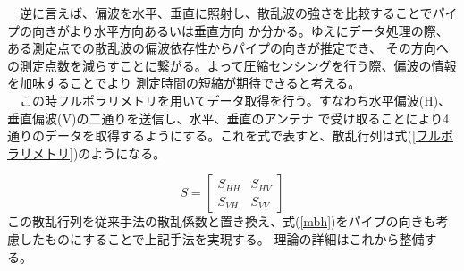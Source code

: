 \documentclass[12pt,a4paper]{jsreport}
\begin{document}
　逆に言えば、偏波を水平、垂直に照射し、散乱波の強さを比較することでパイプの向きがより水平方向あるいは垂直方向
か分かる。ゆえにデータ処理の際、ある測定点での散乱波の偏波依存性からパイプの向きが推定でき、
その方向への測定点数を減らすことに繋がる。よって圧縮センシングを行う際、偏波の情報を加味することでより
測定時間の短縮が期待できると考える。
\\　この時フルポラリメトリを用いてデータ取得を行う。すなわち水平偏波(H)、垂直偏波(V)の二通りを送信し、水平、垂直のアンテナ
で受け取ることにより4通りのデータを取得するようにする。これを式で表すと、散乱行列は式(\ref{フルポラリメトリ})のようになる。

\begin{equation}
  S =
      \left[
      \begin{array}{rrr}
      S_{HH} & S_{HV}  \\
      S_{VH} & S_{VV} 
      
      \end{array}
      \right]\label{フルポラリメトリ}
  \end{equation}
この散乱行列を従来手法の散乱係数と置き換え、式(\ref{mbh})をパイプの向きも考慮したものにすることで上記手法を実現する。
理論の詳細はこれから整備する。









\clearpage
\end{document}
